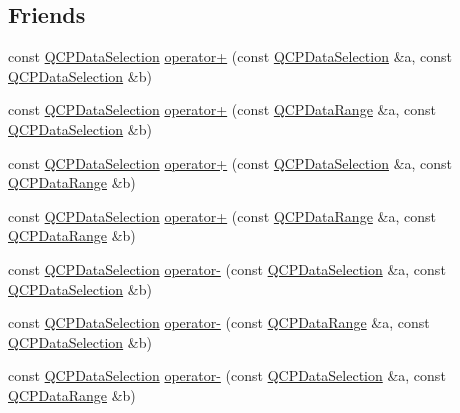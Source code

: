 \subsection*{Friends}
\begin{DoxyCompactItemize}
\item 
const \hyperlink{class_q_c_p_data_selection}{Q\+C\+P\+Data\+Selection} \hyperlink{class_q_c_p_data_selection_a49c0217af248959d59abfdd29401b678}{operator+} (const \hyperlink{class_q_c_p_data_selection}{Q\+C\+P\+Data\+Selection} \&a, const \hyperlink{class_q_c_p_data_selection}{Q\+C\+P\+Data\+Selection} \&b)
\item 
const \hyperlink{class_q_c_p_data_selection}{Q\+C\+P\+Data\+Selection} \hyperlink{class_q_c_p_data_selection_a5feed9419bd3df5cb4d4a761580545cc}{operator+} (const \hyperlink{class_q_c_p_data_range}{Q\+C\+P\+Data\+Range} \&a, const \hyperlink{class_q_c_p_data_selection}{Q\+C\+P\+Data\+Selection} \&b)
\item 
const \hyperlink{class_q_c_p_data_selection}{Q\+C\+P\+Data\+Selection} \hyperlink{class_q_c_p_data_selection_aa574f51a74d6998e9be95e252e6be287}{operator+} (const \hyperlink{class_q_c_p_data_selection}{Q\+C\+P\+Data\+Selection} \&a, const \hyperlink{class_q_c_p_data_range}{Q\+C\+P\+Data\+Range} \&b)
\item 
const \hyperlink{class_q_c_p_data_selection}{Q\+C\+P\+Data\+Selection} \hyperlink{class_q_c_p_data_selection_a0822e3133b80b5dedfc8050a19c1e0c5}{operator+} (const \hyperlink{class_q_c_p_data_range}{Q\+C\+P\+Data\+Range} \&a, const \hyperlink{class_q_c_p_data_range}{Q\+C\+P\+Data\+Range} \&b)
\item 
const \hyperlink{class_q_c_p_data_selection}{Q\+C\+P\+Data\+Selection} \hyperlink{class_q_c_p_data_selection_a41147ef7d6303c746e398278b7b624d1}{operator-\/} (const \hyperlink{class_q_c_p_data_selection}{Q\+C\+P\+Data\+Selection} \&a, const \hyperlink{class_q_c_p_data_selection}{Q\+C\+P\+Data\+Selection} \&b)
\item 
const \hyperlink{class_q_c_p_data_selection}{Q\+C\+P\+Data\+Selection} \hyperlink{class_q_c_p_data_selection_a726652cb9ed840e3025435cc2c266468}{operator-\/} (const \hyperlink{class_q_c_p_data_range}{Q\+C\+P\+Data\+Range} \&a, const \hyperlink{class_q_c_p_data_selection}{Q\+C\+P\+Data\+Selection} \&b)
\item 
const \hyperlink{class_q_c_p_data_selection}{Q\+C\+P\+Data\+Selection} \hyperlink{class_q_c_p_data_selection_a32c5784ac70946f09a09b2dd19816b78}{operator-\/} (const \hyperlink{class_q_c_p_data_selection}{Q\+C\+P\+Data\+Selection} \&a, const \hyperlink{class_q_c_p_data_range}{Q\+C\+P\+Data\+Range} \&b)

\end{DoxyCompactItemize}
